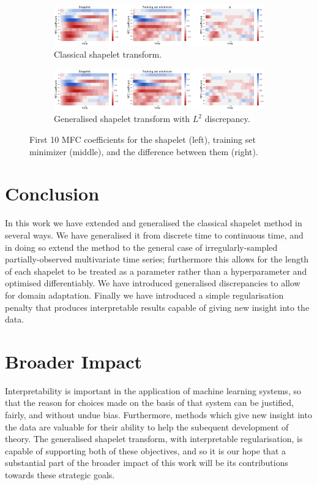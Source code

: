 \documentclass{article}
\theoremstyle{plain}
\theoremstyle{definition}
\begin{document}
	\begin{figure}[t]
		\begin{subfigure}[b]{\linewidth}
			\centering
			\includegraphics[width=\linewidth]{images/old_speech_commands_heatmap.png}
			\caption{Classical shapelet transform.}
			\label{fig:old_speech_commands}
		\end{subfigure}
		\begin{subfigure}[b]{\linewidth}
			\centering
			\includegraphics[width=\linewidth]{images/new_speech_commands_heatmap.png}
			\caption{Generalised shapelet transform with $L^2$ discrepancy.}
			\label{fig:new_speech_commands}
		\end{subfigure}
		\caption{First 10 MFC coefficients for the shapelet (left), training set minimizer (middle), and the difference between them (right).}
		\label{fig:speech_commands}
	\end{figure}




	\section{Conclusion}
	In this work we have extended and generalised the classical shapelet method in several ways. We have generalised it from discrete time to continuous time, and in doing so extend the method to the general case of irregularly-sampled partially-observed multivariate time series; furthermore this allows for the length of each shapelet to be treated as a parameter rather than a hyperparameter and optimised differentiably. We have introduced generalised discrepancies to allow for domain adaptation. Finally we have introduced a simple regularisation penalty that produces interpretable results capable of giving new insight into the data.
	
	\section*{Broader Impact}
	Interpretability is important in the application of machine learning systems, so that the reason for choices made on the basis of that system can be justified, fairly, and without undue bias. Furthermore, methods which give new insight into the data are valuable for their ability to help the subequent development of theory. The generalised shapelet transform, with interpretable regularisation, is capable of supporting both of these objectives, and so it is our hope that a substantial part of the broader impact of this work will be its contributions towards these strategic goals.
	
\end{document}
